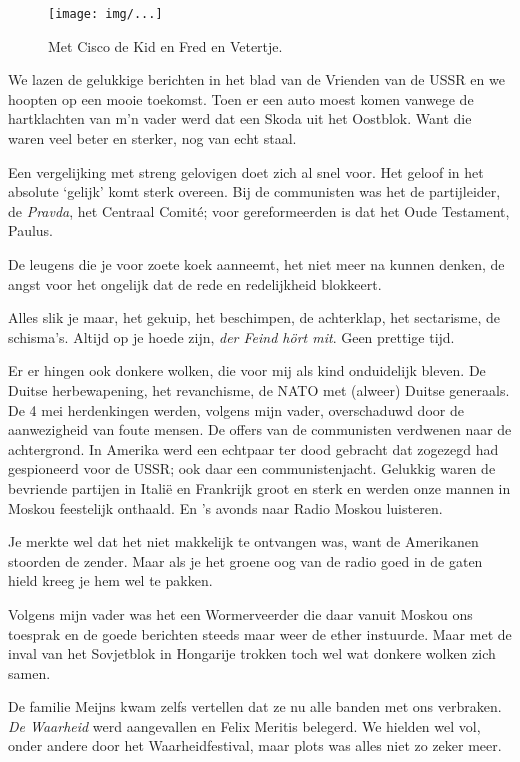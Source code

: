 \documentclass[10pt,twoside,openright]{memoir}
\begin{document}
\begin{figure}[t]
\texttt{[image: img/...]}
\caption{Met Cisco de Kid en Fred en Vetertje.}
\end{figure} 

We lazen de gelukkige berichten in het blad van de Vrienden van de USSR en we hoopten op een mooie toekomst. Toen er een auto moest komen vanwege de hartklachten van m’n vader werd dat een Skoda uit het Oostblok. Want die waren veel beter en sterker, nog van echt staal. 

Een vergelijking met streng gelovigen doet zich al snel voor. Het geloof in het absolute ‘gelijk’ komt sterk overeen. Bij de communisten was het de partijleider, de \emph{Pravda}, het Centraal Comité; voor gereformeerden is dat het Oude Testament, Paulus. 

De leugens die je voor zoete koek aanneemt, het niet meer na kunnen denken, de angst voor het ongelijk dat de rede en redelijkheid blokkeert. 

Alles slik je maar, het gekuip, het beschimpen, de achterklap, het sectarisme, de schisma's. Altijd op je hoede zijn, \emph{der Feind hört mit}. Geen prettige tijd. 

Er er hingen ook donkere wolken, die voor mij als kind onduidelijk bleven. De Duitse herbewapening, het revanchisme, de NATO met (alweer) Duitse generaals. De 4 mei herdenkingen werden, volgens mijn vader, overschaduwd door de aanwezigheid van foute mensen. De offers van de communisten verdwenen naar de achtergrond. In Amerika werd een echtpaar ter dood gebracht dat zogezegd had gespioneerd voor de USSR; ook daar een communistenjacht. Gelukkig waren de bevriende partijen in Italië en Frankrijk groot en sterk en werden onze mannen in Moskou feestelijk onthaald. En ’s avonds naar Radio Moskou luisteren. 

Je merkte wel dat het niet makkelijk te ontvangen was, want de Amerikanen stoorden de zender. Maar als je het groene oog van de radio goed in de gaten hield kreeg je hem wel te pakken. 

Volgens mijn vader was het een Wormerveerder die daar vanuit Moskou ons toesprak en de goede berichten steeds maar weer de ether instuurde. Maar met de inval van het Sovjetblok in Hongarije trokken toch wel wat donkere wolken zich samen. 

De familie Meijns kwam zelfs vertellen dat ze nu alle banden met ons verbraken. \emph{De Waarheid} werd aangevallen en Felix Meritis belegerd. We hielden wel vol, onder andere door het Waarheidfestival, maar plots was alles niet zo zeker meer.
\end{document}
